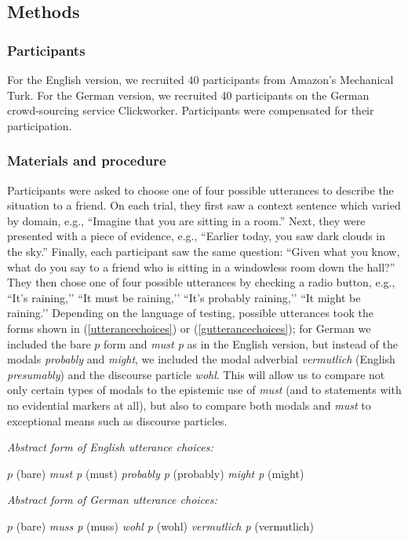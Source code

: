 \documentclass[11pt]{article}
\newcommand{\eref}[1]{(\ref{#1})}
\begin{document}
\subsection{Methods}

\subsubsection{Participants}

For the English version, we recruited 40 participants from Amazon's Mechanical Turk. For the German version, we recruited 40 participants on the German crowd-sourcing service Clickworker. Participants were compensated for their participation.

\subsubsection{Materials and procedure}

Participants were asked to choose one of four possible utterances to describe the situation to a friend. On each trial, they first saw a context sentence which varied by domain, e.g., ``Imagine that you are sitting in a room.'' Next, they were presented with a piece of evidence, e.g., ``Earlier today, you saw dark clouds in the sky.'' Finally, each participant saw the same question: ``Given what you know, what do you say to a friend who is sitting in a windowless room down the hall?'' They then chose one of four possible utterances by checking a radio button, e.g., ``It's raining,’’ ``It must be raining,’’ ``It's probably raining,’’ ``It might be raining.’’ Depending on the language of testing, possible utterances took the forms shown in \eref{utterancechoices} or \eref{gutterancechoices}; for German we included the bare $p$ form and \emph{must p} as in the English version, but instead of the modals \emph{probably} and \emph{might}, we included the modal adverbial \emph{vermutlich} (English \emph{presumably}) and the discourse particle \emph{wohl}. This will allow us to compare not only certain types of modals to the epistemic use of \emph{must} (and to statements with no evidential markers at all), but also to compare both modals and \emph{must} to exceptional means such as discourse particles. 


\begin{exe}
	\ex\label{utterancechoices} \emph{Abstract form of English utterance choices:}
	\begin{xlist}
		\ex $p$ (bare)
		\ex \emph{must p} (must)
		\ex \emph{probably p} (probably)
		\ex \emph{might p} (might)
		\end{xlist}
	\ex\label{gutterancechoices} \emph{Abstract form of German utterance choices:}
	\begin{xlist}
		\ex $p$ (bare)
		\ex \emph{muss p} (muss)
		\ex \emph{wohl p} (wohl)
		\ex \emph{vermutlich p} (vermutlich)
		\end{xlist}
		\end{exe}
		
\end{document}

